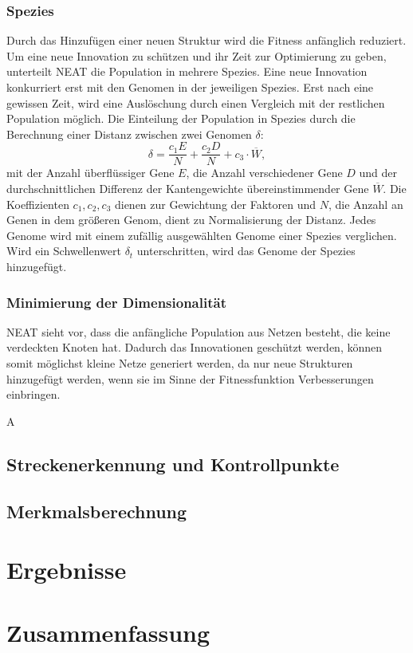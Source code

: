 \documentclass[11pt,final,journal,a4paper,towside,towcolumn]{IEEEtran}
\begin{document}
\subsubsection{Spezies}
Durch das Hinzufügen einer neuen Struktur wird die Fitness anfänglich reduziert. Um eine neue Innovation zu schützen und ihr Zeit zur Optimierung zu geben, unterteilt \ac{NEAT} die Population in mehrere Spezies. Eine neue Innovation konkurriert erst mit den Genomen in der jeweiligen Spezies. Erst nach eine gewissen Zeit, wird eine Auslöschung durch einen Vergleich mit der restlichen Population möglich. Die Einteilung der Population in Spezies durch die Berechnung einer Distanz zwischen zwei Genomen $\delta$:
\begin{equation}
\delta=\frac{c_1E}{N} + \frac{c_2D}{N} + c_3\cdot \overline{W},
\end{equation}
mit der Anzahl überflüssiger Gene $E$, die Anzahl verschiedener Gene $D$ und der durchschnittlichen Differenz der Kantengewichte übereinstimmender Gene $\overline{W}$. Die Koeffizienten $c_1, c_2, c_3$ dienen zur Gewichtung der Faktoren und $N$, die Anzahl an Genen in dem größeren Genom, dient zu Normalisierung der Distanz. Jedes Genome wird mit einem zufällig ausgewählten Genome einer Spezies verglichen. Wird ein Schwellenwert $\delta_t$ unterschritten, wird das Genome der Spezies hinzugefügt.
\subsubsection{Minimierung der Dimensionalität}
\ac{NEAT} sieht vor, dass die anfängliche Population aus Netzen besteht, die keine verdeckten Knoten hat. Dadurch das Innovationen geschützt werden, können somit möglichst kleine Netze generiert werden, da nur neue Strukturen hinzugefügt werden, wenn sie im Sinne der Fitnessfunktion Verbesserungen einbringen.

A

\subsection{Streckenerkennung und Kontrollpunkte}

\subsection{Merkmalsberechnung}

\section{Ergebnisse}

\section{Zusammenfassung}

{}

\end{document}
